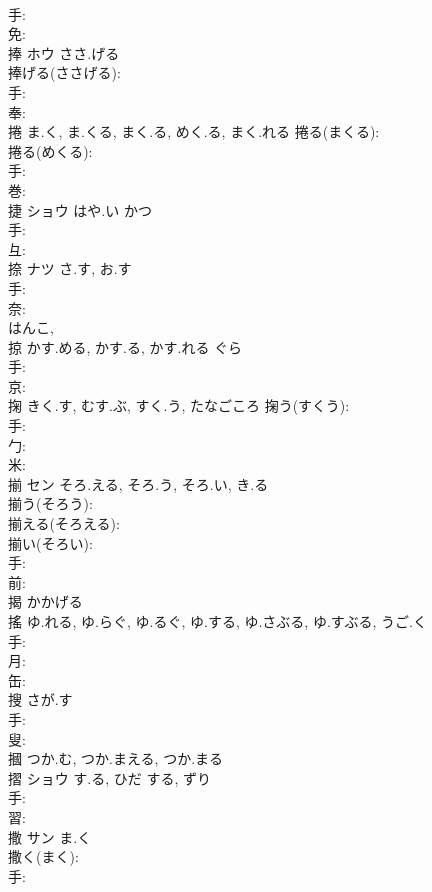 \documentclass[8pt]{extreport}
\begin{document}
\begin{CJK}{UTF8}{min}
\\	手: 
\\	免: 
\\	捧	ホウ	ささ.げる		
\\	捧げる(ささげる): 
\\	手: 
\\	奉: 
\\	捲		ま.く, ま.くる, まく.る, めく.る, まく.れる			捲る(まくる): 
\\	捲る(めくる): 
\\	手: 
\\	巻: 
\\	捷	ショウ	はや.い	かつ	
\\	手: 
\\	彑: 
\\	捺	ナツ	さ.す, お.す		
\\	手: 
\\	奈: 
\\	はんこ, 
\\	掠		かす.める, かす.る, かす.れる	ぐら			
\\	手: 
\\	京: 
\\	掬		きく.す, むす.ぶ, すく.う, たなごころ			掬う(すくう): 
\\	手: 
\\	勹: 
\\	米: 
\\	揃	セン	そろ.える, そろ.う, そろ.い, き.る		
\\	揃う(そろう): 
\\	揃える(そろえる): 
\\	揃い(そろい): 
\\	手: 
\\	前: 
\\	揭		かかげる				
\\	搖		ゆ.れる, ゆ.らぐ, ゆ.るぐ, ゆ.する, ゆ.さぶる, ゆ.すぶる, うご.く				
\\	手: 
\\	月: 
\\	缶: 
\\	搜		さが.す				
\\	手: 
\\	叟: 
\\	摑		つか.む, つか.まえる, つか.まる				
\\	摺	ショウ	す.る, ひだ	する, ずり	
\\	手: 
\\	習: 
\\	撒	サン	ま.く		
\\	撒く(まく): 
\\	手: 

\end{CJK}
\end{document}
